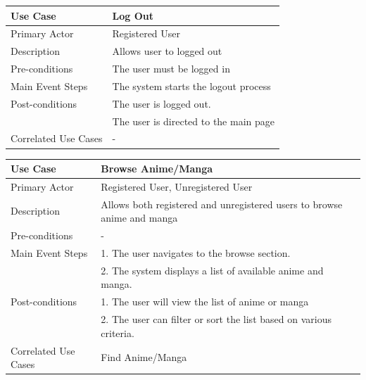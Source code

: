 \begin{longtable}{|p{}|p{}|}
    \hline
    \rowcolor{lightblue}
    \textbf{Use Case} & \textbf{Log Out} \\
    \hline
    Primary Actor &Registered User\\
    \hline
    Description & Allows user to logged out\\
    \hline
    Pre-conditions & The user must be logged in\\
    \hline
    Main Event Steps & The system starts the logout process \\
    \hline
    Post-conditions &The user is logged out. \\
    & The user is directed to the main page \\
    \hline
    Correlated Use Cases &-\\
    \hline
\end{longtable}


\begin{longtable}{|p{}|p{}|}
    \hline
    \rowcolor{lightblue}
    \textbf{Use Case} & \textbf{Browse Anime/Manga} \\
    \hline
    Primary Actor & Registered User, Unregistered User\\
    \hline
    Description & Allows both registered and unregistered users to browse anime and manga\\
    \hline
    Pre-conditions & - \\
    \hline
    Main Event Steps & 1. The user navigates to the browse section. \\
    & 2. The system displays a list of available anime and manga. \\
    \hline
    Post-conditions & 1. The user will view the list of anime or manga\\
    & 2. The user can filter or sort the list based on various criteria. \\
    \hline
    Correlated Use Cases & Find Anime/Manga\\
    \hline
\end{longtable}


